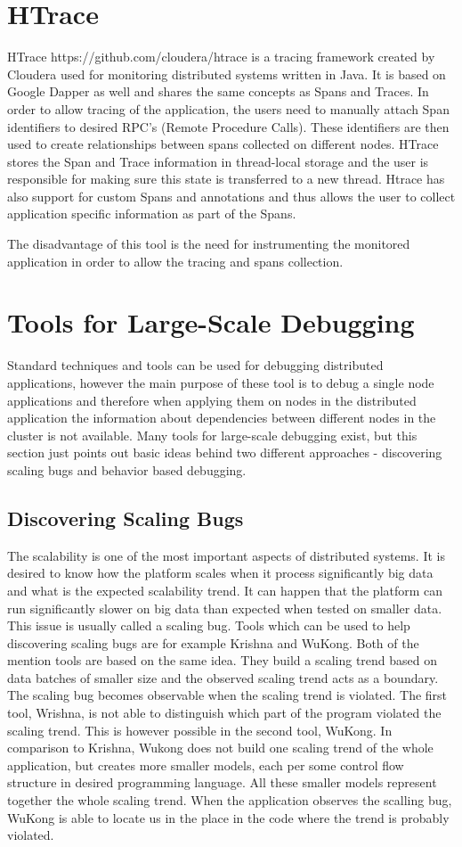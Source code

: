  \section{HTrace}
 \label{htrace}
 HTrace https://github.com/cloudera/htrace is a tracing framework created by Cloudera used for monitoring distributed systems written in Java. It is based on Google Dapper as well and shares the same concepts as Spans and Traces. In order to allow tracing of the application, the users need to manually attach Span identifiers to desired RPC's (Remote Procedure Calls). These identifiers are then used to create relationships between spans collected on different nodes. HTrace stores the Span and Trace information in thread-local storage and the user is responsible for making sure this state is transferred to a new thread. Htrace has also support for custom Spans and annotations and thus allows the user to collect application specific information as part of the Spans. 
 
 The disadvantage of this tool is the need for instrumenting the monitored application in order to allow the tracing and spans collection.
\section{Tools for Large-Scale Debugging}
Standard techniques and tools can be used for debugging distributed applications, however the main purpose of these tool is to debug a single node applications and therefore when applying them on nodes in the distributed application the information about dependencies between different nodes in the cluster is not available. Many tools for large-scale debugging exist, but this section just points out basic ideas behind two different approaches - discovering scaling bugs and behavior based debugging. 

\subsection{Discovering Scaling Bugs}
The scalability is one of the most important aspects of distributed systems. It is desired to know how the platform scales when it process significantly big data and what is the expected scalability trend. It can happen that the platform can run significantly slower on big data than expected when tested on smaller data. This issue is usually called a scaling bug. Tools which can be used to help discovering scaling bugs are for example Krishna and WuKong. Both of the mention tools are based on the same idea. They build a scaling trend based on data batches of smaller size and the observed scaling trend acts as a boundary. The scaling bug becomes observable when the scaling trend is violated. The first tool, Wrishna, is not able to distinguish which part of the program violated the scaling trend. This is however possible in the second tool, WuKong. In comparison to Krishna, Wukong does not build one scaling trend of the whole application, but creates more smaller models, each per some control flow structure in desired programming language. All these smaller models represent together the whole scaling trend. When the application observes the scalling bug, WuKong is able to locate us in the place in the code where the trend is probably violated.

